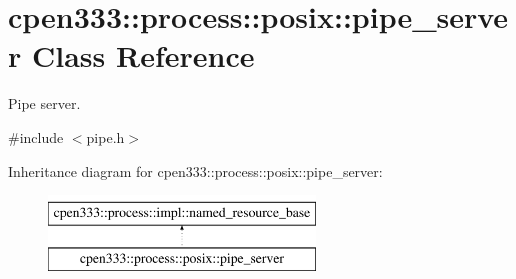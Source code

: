 \hypertarget{classcpen333_1_1process_1_1posix_1_1pipe__server}{}\section{cpen333\+:\+:process\+:\+:posix\+:\+:pipe\+\_\+server Class Reference}
\label{classcpen333_1_1process_1_1posix_1_1pipe__server}


Pipe server.  




{\ttfamily \#include $<$pipe.\+h$>$}

Inheritance diagram for cpen333\+:\+:process\+:\+:posix\+:\+:pipe\+\_\+server\+:\begin{figure}[H]
\begin{center}
\leavevmode
\includegraphics[height=2.000000cm]{classcpen333_1_1process_1_1posix_1_1pipe__server}
\end{center}
\end{figure}
